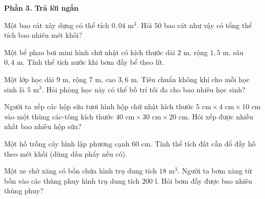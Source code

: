 \textbf{Phần 3. Trả lời ngắn}

\begin{ex} %
Một bao cát xây dựng có thể tích $0{,}04\text{ m}^3$. Hỏi $50$ bao cát như vậy có tổng thể tích bao nhiêu mét khối?
\end{ex}

\begin{ex} %
Một bể phao bơi mini hình chữ nhật có kích thước dài $2\text{ m}$, rộng $1{,}5\text{ m}$, sâu $0{,}4\text{ m}$. Tính thể tích nước khi bơm đầy bể theo lít.
\end{ex}

\begin{ex} %
Một lớp học dài $9\text{ m}$, rộng $7\text{ m}$, cao $3{,}6\text{ m}$. Tiêu chuẩn không khí cho mỗi học sinh là $5\text{ m}^3$. Hỏi phòng học này có thể bố trí tối đa cho bao nhiêu học sinh?
\end{ex}

\begin{ex} %
Người ta xếp các hộp sữa tươi hình hộp chữ nhật kích thước $5\text{ cm} \times 4\text{ cm} \times 10\text{ cm}$ vào một thùng các-tông kích thước $40\text{ cm} \times 30\text{ cm} \times 20\text{ cm}$. Hỏi xếp được nhiều nhất bao nhiêu hộp sữa?
\end{ex}

\begin{ex} %
Một hố trồng cây hình lập phương cạnh $60\text{ cm}$. Tính thể tích đất cần đổ đầy hố theo mét khối (dùng dấu phẩy nếu có).
\end{ex}

\begin{ex} %
Một xe chở xăng có bồn chứa hình trụ dung tích $18\text{ m}^3$. Người ta bơm xăng từ bồn vào các thùng phuy hình trụ dung tích $200\text{ l}$. Hỏi bơm đầy được bao nhiêu thùng phuy?
\end{ex}
